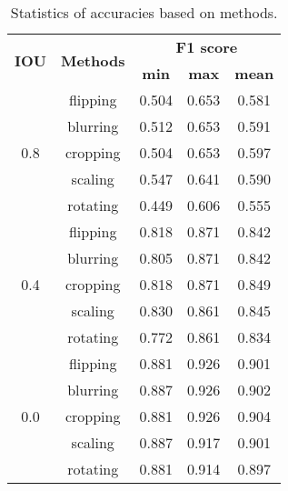 \documentclass[preprint,12pt,authoryear]{elsarticle}
\begin{document}
\begin{table}[ht]
\centering
\footnotesize
\caption{Statistics of accuracies based on methods.}
\label{table_minacc_imgaug}
\begin{tabular}{c c c c  c  }
\toprule
\multirow{2}{*}{\textbf{IOU}}&\multirow{2}{*}{\textbf{Methods}}& \multicolumn{3}{c}{ \textbf{F1 score}} \\
 & &\textbf{min}&\textbf{max}&\textbf{mean}\\
\midrule
\multirow{5}{*}{0.8} &   flipping & 0.504 & 0.653 & 0.581 \\
  & blurring & 0.512 & 0.653 & 0.591\\
 & cropping & 0.504 & 0.653 & 0.597\\
 & scaling & 0.547 & 0.641 & 0.590\\
& rotating & 0.449 & 0.606 & 0.555 \\

\midrule
\multirow{5}{*}{0.4} &  flipping & 0.818 & 0.871 & 0.842 \\
 &  blurring & 0.805 & 0.871 & 0.842\\
 & cropping & 0.818 & 0.871 & 0.849\\
 & scaling & 0.830 & 0.861 & 0.845\\
& rotating & 0.772 & 0.861 & 0.834\\

\midrule
\multirow{5}{*}{0.0} & flipping & 0.881 & 0.926 & 0.901 \\
  &blurring & 0.887 & 0.926 & 0.902\\
  &cropping & 0.881 & 0.926 & 0.904\\
 &scaling & 0.887 & 0.917 & 0.901\\
&rotating & 0.881 & 0.914 & 0.897\\

\bottomrule
\end{tabular}
\end{table}


\end{document}
